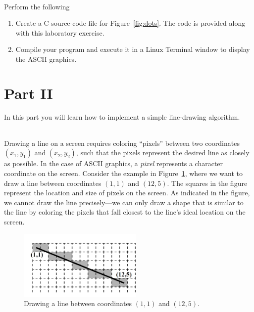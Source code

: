 \documentclass[epsfig,10pt,fullpage]{article}
\begin{document}
~\\
\noindent
Perform the following

\begin{enumerate}

\item Create a C source-code file for Figure~\ref{fig:dots}. The code is provided along 
with this laboratory exercise.

\item Compile your program and execute it in a Linux Terminal window to display the ASCII
graphics.

\end{enumerate}

\noindent
\section*{Part II}

\noindent
In this part you will learn how to implement a simple line-drawing algorithm.

~\\
\noindent
Drawing a line on a screen requires coloring ``pixels'' between two coordinates $(x_1,y_1)$ and 
$(x_2,y_2)$, such that the pixels represent the desired line as closely as possible. In
the case of ASCII graphics, a {\it pixel} represents a character coordinate on the screen.
Consider the example in Figure~\ref{fig:line_drawing}, where we want to draw a line between 
coordinates $(1,1)$ and $(12,5)$. The squares in the figure represent the location and 
size of pixels on the screen. As indicated in the figure, we cannot draw the line 
precisely---we can only draw a shape that is similar to the line by coloring the pixels that 
fall closest to the line's ideal location on the screen.

\begin{figure}[h]
   \begin{center}
              \includegraphics[width=6cm]{figures/fig_line_drawing_vt100}
   \end{center}
   \caption{Drawing a line between coordinates $(1,1)$ and $(12,5)$.}
    \label{fig:line_drawing}
\end{figure}
\end{document}
